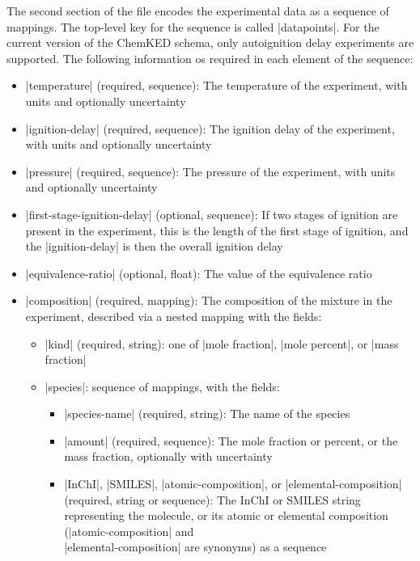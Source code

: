 \documentclass[12pt]{ijck}
\newcommand\ck{ChemKED}
\begin{document}
The second section of the file encodes the experimental data as a sequence of mappings. The
top-level key for the sequence is called \yabox|datapoints|. For the current version of the \ck{}
schema, only autoignition delay experiments are supported. The following information os required in
each element of the sequence:
%
\begin{itemize}
    \item \yabox|temperature| (required, sequence): The temperature of the
    experiment, with units and optionally uncertainty
    \item \yabox|ignition-delay| (required, sequence): The ignition delay of the
    experiment, with units and optionally uncertainty
    \item \yabox|pressure| (required, sequence): The pressure of the experiment,
    with units and optionally uncertainty
    \item \yabox|first-stage-ignition-delay| (optional, sequence): If two stages of ignition are
    present in the experiment, this is the length of the first stage of ignition, and the
    \yabox|ignition-delay| is then the overall ignition delay
    \item \yabox|equivalence-ratio| (optional, float): The value of the equivalence ratio
    \item \yabox|composition| (required, mapping): The composition of the
    mixture in the experiment, described via a nested mapping with the fields:
    \begin{itemize}
        \item \yabox|kind| (required, string): one of \yabox|mole fraction|, \yabox|mole percent|, or \yabox|mass fraction|
        \item \yabox|species|: sequence of mappings, with the fields:
        \begin{itemize}
            \item \yabox|species-name| (required, string): The name of the species
            \item \yabox|amount| (required, sequence): The mole fraction or percent, or the mass fraction, optionally with uncertainty
            \item \yabox|InChI|, \yabox|SMILES|, \yabox|atomic-composition|, or
            \yabox|elemental-composition| (required, string or sequence): The InChI
            or SMILES string representing the molecule, or its atomic or elemental
            composition (\yabox|atomic-composition| and\\
            \yabox|elemental-composition| are synonyms) as a sequence

\end{itemize}
\end{itemize}
\end{itemize}
\end{document}
